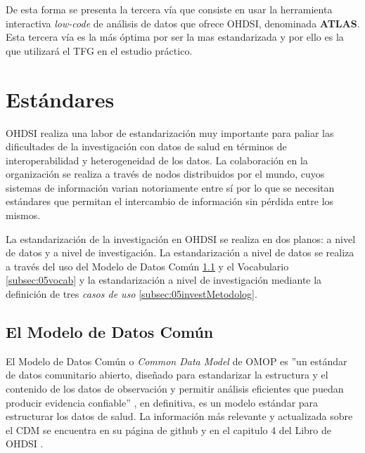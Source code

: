 De esta forma se presenta la tercera vía que consiste en usar la herramienta interactiva \textit{low-code} de análisis de datos que ofrece OHDSI, denominada \textbf{ATLAS}. Esta tercera vía es la más óptima por ser la mas estandarizada y por ello es la que utilizará el TFG en el estudio práctico.


\section{Estándares}\label{sec:05estandares}


OHDSI realiza una labor de estandarización muy importante para paliar las dificultades de la investigación con datos de salud en términos de interoperabilidad y heterogeneidad de los datos. La colaboración en la organización se realiza a través de nodos distribuidos por el mundo, cuyos sistemas de información varian notoriamente entre sí por lo que se necesitan estándares que permitan el intercambio de información sin pérdida entre los mismos.

La estandarización de la investigación en OHDSI se realiza en dos planos: a nivel de datos y a nivel de investigación. La estandarización a nivel de datos se realiza a través del uso del Modelo de Datos Común \ref{subsec:05cdm} y el Vocabulario \ref{subsec:05vocab} y la estandarización a nivel de investigación mediante la definición de tres \textit{casos de uso} \ref{subsec:05investMetodolog}.

\subsection{El Modelo de Datos Común} \label{subsec:05cdm}

El Modelo de Datos Común o \textit{Common Data Model} de OMOP es ''un estándar de datos comunitario abierto, diseñado para estandarizar la estructura y el contenido de los datos de observación y permitir análisis eficientes que puedan producir evidencia confiable'' \cite{gitPagesCMD}, en definitiva, es un modelo estándar para estructurar los datos de salud. La información más relevante y actualizada sobre el CDM se encuentra en su página de github \cite{gitPagesCMD} y en el capitulo 4 del Libro de OHDSI \cite{OHDSIbook}.

